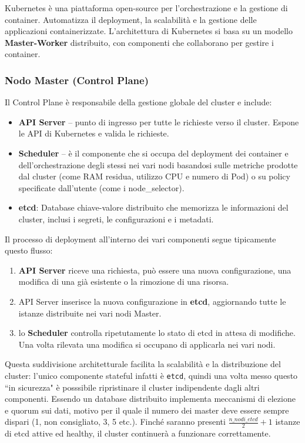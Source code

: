 Kubernetes è una piattaforma open-source per l'orchestrazione e la gestione di container. Automatizza il deployment, la scalabilità e la gestione delle applicazioni containerizzate.
L'architettura di Kubernetes\cite{kubernetesComponents} si basa su un modello \textbf{Master-Worker} distribuito\cite{Rejiba2022Custom}, con componenti che collaborano per gestire i container.

\subsubsection{Nodo Master (Control Plane)}
Il Control Plane è responsabile della gestione globale del cluster e include:
\begin{itemize}
    \item \textbf{API Server} -- punto di ingresso per tutte le richieste verso il cluster. Espone le API di Kubernetes e valida le richieste.
    \item \textbf{Scheduler} -- è il componente che si occupa del deployment dei container e dell'orchestrazione degli stessi nei vari nodi basandosi sulle metriche prodotte dal cluster (come RAM residua, utilizzo CPU e numero di Pod) o su policy specificate dall'utente (come i node\_selector).
    \item \textbf{etcd}: Database chiave-valore distribuito che memorizza le informazioni del cluster, inclusi i segreti, le configurazioni e i metadati. 
\end{itemize}

Il processo di deployment all'interno dei vari componenti segue tipicamente questo flusso:
\begin{enumerate}
    \item \textbf{API Server} riceve una richiesta, può essere una nuova configurazione, una modifica di una già esistente o la rimozione di una risorsa.
    \item API Server inserisce la nuova configurazione in \textbf{etcd}, aggiornando tutte le istanze distribuite nei vari nodi Master.
    \item lo \textbf{Scheduler} controlla ripetutamente lo stato di etcd in attesa di modifiche. Una volta rilevata una modifica si occupano di applicarla nei vari nodi.
\end{enumerate}

Questa suddivisione architetturale facilita la scalabilità e la distribuzione del cluster: l'unico componente stateful infatti è \texttt{etcd}, quindi una volta messo questo ``in sicurezza" è posssibile ripristinare il cluster indipendente dagli altri componenti. Essendo un database distribuito implementa meccanismi di elezione e quorum sui dati, motivo per il quale il numero dei master deve essere sempre dispari (1, non consigliato, 3, 5 etc.). Finché saranno presenti \(\frac{n\_nodi\_etcd}{2} + 1\) istanze di etcd attive ed healthy, il cluster continuerà a funzionare correttamente.

